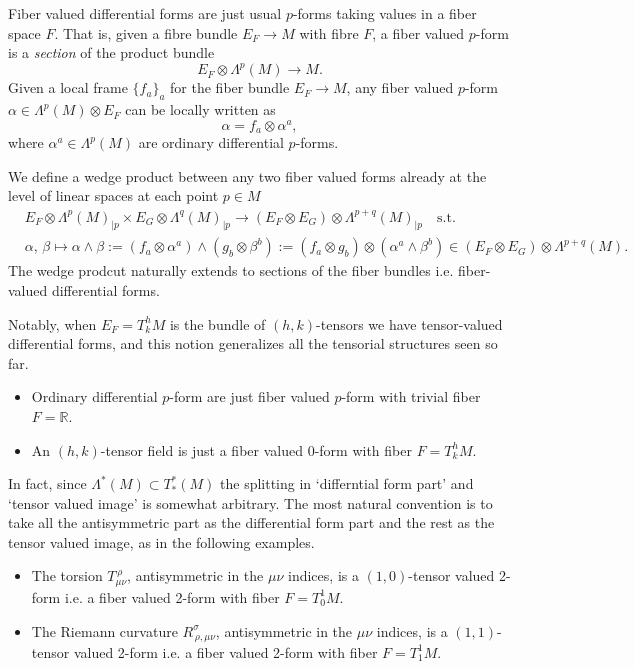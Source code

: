 \begin{mytheorem}
Fiber valued differential forms are just usual $p$-forms taking values in a fiber space $F$.
That is, given a fibre bundle $E_F\to M$ with fibre $F$, a fiber valued $p$-form is a \emph{section} of the product bundle
\begin{equation}
     E_F \otimes \Lambda^p (M) \to M.
\end{equation}
Given a local frame $\{f_a\}_a$ for the fiber bundle $E_F \to M$, any fiber valued $p$-form $\alpha \in \Lambda^p (M) \otimes E_F$ can be locally written as
\begin{equation}
    \alpha =  f_a \otimes \alpha^a,
\end{equation}
where $\alpha^a \in \Lambda^p (M)$ are ordinary differential $p$-forms.
\smallskip

We define a wedge product between any two fiber valued forms already at the level of linear spaces at each point $p\in M$
\begin{align}
    &E_F \otimes \Lambda^p (M)_{\mid p} \times E_G \otimes \Lambda^q (M)_{\mid p} \to (E_F \otimes E_G) \otimes \Lambda^{p+q} (M)_{\mid p} \quad \text{s.t.}\\[5pt]
    &\alpha,\,\beta \mapsto \alpha \wedge \beta := (f_a \otimes \alpha^a) \wedge (g_b \otimes \beta^b) 
    := (f_a \otimes g_b) \otimes (\alpha^a \wedge \beta^b) \in (E_F \otimes E_G) \otimes \Lambda^{p+q} (M).
\end{align}
The wedge prodcut naturally extends to sections of the fiber bundles i.e. fiber-valued differential forms.
\smallskip 

Notably, when $E_F = T^h_kM$ is the bundle of $(h,k)$-tensors we have tensor-valued differential forms, and this notion generalizes all the tensorial structures seen so far.
\begin{itemize}
    \item Ordinary differential $p$-form are just fiber valued $p$-form with trivial fiber $F = \mathbb{R}$.
    \item An $(h,k)$-tensor field is just a fiber valued $0$-form with fiber $F = T^h_k M$.
\end{itemize}
%
In fact, since $\Lambda^*(M)\subset T^*_*(M)$ the splitting in `differntial form part' and `tensor valued image' is somewhat arbitrary.
The most natural convention is to take all the antisymmetric part as the differential form part and the rest as the tensor valued image, as in the following examples.
\begin{itemize}
    \item The torsion $T_{\mu\nu}^{\, \rho}$, antisymmetric in the $\mu\nu$ indices, is a $(1,0)$-tensor valued 2-form i.e. a fiber valued 2-form with fiber $F = T^1_0 M$.
    \item The Riemann curvature $R_{\,\rho, \mu \nu}^{\sigma}$, antisymmetric in the $\mu\nu$ indices, is a $(1,1)$-tensor valued 2-form i.e. a fiber valued 2-form with fiber $F = T^1_1 M$.
\end{itemize}
\end{mytheorem}




